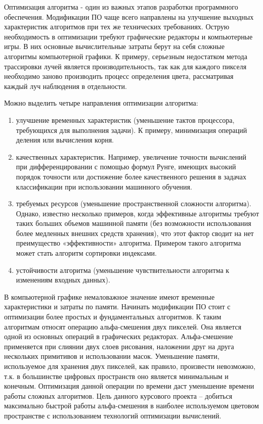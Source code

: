\Introduction

 Оптимизация алгоритма - один из важных этапов разработки программного обеспечения. Модификации ПО чаще всего направлены на улучшение выходных характеристик алгоритмов при тех же технических требованиях. Острую необходимость в оптимизации  требуют графические редакторы и компьютерные игры. В них основные вычислительные затраты берут на себя сложные алгоритмы компьютерной графики. К примеру, серьезным недостатком метода трассировки лучей является производительность, так как для каждого пикселя необходимо заново производить процесс определения цвета, рассматривая каждый луч наблюдения в отдельности.
 
Можно выделить четыре направления оптимизации алгоритма: 
\begin{enumerate}
\item улучшение временных характеристик (уменьшение тактов процессора, требующихся для выполнения задачи). К примеру, минимизация операций деления или вычисления корня. 
\item качественных характеристик. Например, увеличение точности вычислений при дифференцировании с помощью формул Рунге, имеющих высокий порядок точности или достижение более качественного решения в задачах классификации  при использовании машинного обучения.
\item требуемых ресурсов (уменьшение пространственной сложности алгоритма). Однако, известно несколько примеров, когда эффективные алгоритмы требуют таких больших объемов машинной памяти (без возможности использования более медленных внешних средств хранения), что этот фактор сводит на нет преимущество «эффективности» алгоритма. Примером такого алгоритма может стать алгоритм сортировки индексами.
\item устойчивости алгоритма (уменьшение чувствительности алгоритма к изменениям входных данных).
\end{enumerate}

В компьютерной графике немаловажное значение имеют временные характеристики и затраты по памяти. Начинать модификации ПО стоит с оптимизации более простых и фундаментальных алгоритмов. К таким алгоритмам относят операцию альфа-смешения двух пикселей. Она является одной из основных операций в графических редакторах. Альфа-смешение применяется при слиянии двух слоев рисования, наложении друг на друга нескольких  примитивов и использовании масок. Уменьшение памяти, используемое для хранения двух пикселей, как правило, произвести невозможно, т.к. в большинстве цифровых пространств оно является минимальным и конечным. Оптимизация данной операции по времени даст уменьшение времени работы сложных алгоритмов.  Цель данного курсового проекта -- добиться максимально быстрой работы альфа-смешения в наиболее используемом
цветовом пространстве с использованием технологий оптимизации вычислений.
 
  
 
 
 
